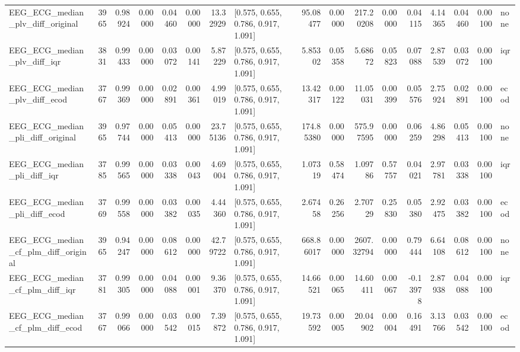 \begin{tabular}{lrrrrrrlrrrrrrrrl}
EEG\_ECG\_median\_plv\_diff\_original & 3965 & 0.98924 & 0.00000 & 0.04460 & 0.00000 & 13.32929 & [0.575, 0.655, 0.786, 0.917, 1.091] & 95.08477 & 0.00000 & 217.20208 & 0.00000 & 0.04115 & 4.14365 & 0.04460 & 0.00100 & none \\
EEG\_ECG\_median\_plv\_diff\_iqr & 3831 & 0.99433 & 0.00000 & 0.03072 & 0.00141 & 5.87229 & [0.575, 0.655, 0.786, 0.917, 1.091] & 5.85302 & 0.05358 & 5.68672 & 0.05823 & 0.07088 & 2.87539 & 0.03072 & 0.00100 & iqr \\
EEG\_ECG\_median\_plv\_diff\_ecod & 3767 & 0.99369 & 0.00000 & 0.02891 & 0.00361 & 4.99019 & [0.575, 0.655, 0.786, 0.917, 1.091] & 13.42317 & 0.00122 & 11.05031 & 0.00399 & 0.05576 & 2.75924 & 0.02891 & 0.00100 & ecod \\
EEG\_ECG\_median\_pli\_diff\_original & 3965 & 0.97744 & 0.00000 & 0.05413 & 0.00000 & 23.75136 & [0.575, 0.655, 0.786, 0.917, 1.091] & 174.85380 & 0.00000 & 575.97595 & 0.00000 & 0.06259 & 4.86298 & 0.05413 & 0.00100 & none \\
EEG\_ECG\_median\_pli\_diff\_iqr & 3785 & 0.99565 & 0.00000 & 0.03338 & 0.00043 & 4.69004 & [0.575, 0.655, 0.786, 0.917, 1.091] & 1.07319 & 0.58474 & 1.09786 & 0.57757 & 0.04021 & 2.97781 & 0.03338 & 0.00100 & iqr \\
EEG\_ECG\_median\_pli\_diff\_ecod & 3769 & 0.99558 & 0.00000 & 0.03382 & 0.00035 & 4.44360 & [0.575, 0.655, 0.786, 0.917, 1.091] & 2.67458 & 0.26256 & 2.70729 & 0.25830 & 0.05380 & 2.92475 & 0.03382 & 0.00100 & ecod \\
EEG\_ECG\_median\_cf\_plm\_diff\_original & 3965 & 0.94247 & 0.00000 & 0.08612 & 0.00000 & 42.79722 & [0.575, 0.655, 0.786, 0.917, 1.091] & 668.86017 & 0.00000 & 2607.32794 & 0.00000 & 0.79444 & 6.64108 & 0.08612 & 0.00100 & none \\
EEG\_ECG\_median\_cf\_plm\_diff\_iqr & 3781 & 0.99305 & 0.00000 & 0.04088 & 0.00001 & 9.36370 & [0.575, 0.655, 0.786, 0.917, 1.091] & 14.66521 & 0.00065 & 14.60411 & 0.00067 & -0.13978 & 2.87938 & 0.04088 & 0.00100 & iqr \\
EEG\_ECG\_median\_cf\_plm\_diff\_ecod & 3767 & 0.99066 & 0.00000 & 0.03542 & 0.00015 & 7.39872 & [0.575, 0.655, 0.786, 0.917, 1.091] & 19.73592 & 0.00005 & 20.04902 & 0.00004 & 0.16491 & 3.13766 & 0.03542 & 0.00100 & ecod \\
\bottomrule
\end{tabular}